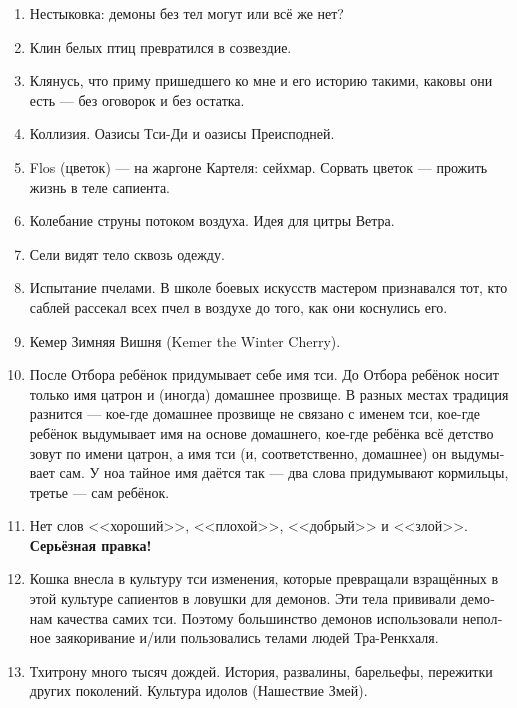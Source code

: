 \documentclass[a4paper,12pt,fleqn]{book}\usepackage{cooltooltips}\usepackage{polyglossia}\setdefaultlanguage[babelshorthands=true]{russian}\setotherlanguage{english}\defaultfontfeatures{Ligatures=TeX,Mapping=tex-text} \usepackage{xcolor}\definecolor{lightgray}{HTML}{bbbbbb}\color{lightgray}\newcommand{\ml}[3]{\textenglish{\textcolor{black}{#3}}}
\begin{document}
{\begin{enumerate}
\item Нестыковка: демоны без тел могут или всё же нет?

\item Клин белых птиц превратился в созвездие.

\item Клянусь, что приму пришедшего ко мне и его историю такими, каковы они есть --- без оговорок и без остатка.

\item Коллизия. Оазисы Тси-Ди и оазисы Преисподней.

\item Flos (цветок) --- на жаргоне Картеля: сейхмар.
Сорвать цветок --- прожить жизнь в теле сапиента.

\item Колебание струны потоком воздуха.
Идея для цитры Ветра.

\item Сели видят тело сквозь одежду.

\item Испытание пчелами.
В школе боевых искусств мастером признавался тот, кто саблей рассекал всех пчел в воздухе до того, как они коснулись его.

\item Кемер Зимняя Вишня (Kemer the Winter Cherry).

\item После Отбора ребёнок придумывает себе имя тси.
До Отбора ребёнок носит только имя цатрон и (иногда) домашнее прозвище.
В разных местах традиция разнится --- кое-где домашнее прозвище не связано с именем тси, кое-где ребёнок выдумывает имя на основе домашнего, кое-где ребёнка всё детство зовут по имени цатрон, а имя тси (и, соответственно, домашнее) он выдумывает сам.
У ноа тайное имя даётся так --- два слова придумывают кормильцы, третье --- сам ребёнок.

\item Нет слов <<хороший>>, <<плохой>>, <<добрый>> и <<злой>>.
\textbf{Серьёзная правка!}

\item Кошка внесла в культуру тси изменения, которые превращали взращённых в этой культуре сапиентов в ловушки для демонов.
Эти тела прививали демонам качества самих тси.
Поэтому большинство демонов использовали неполное заякоривание и/или пользовались телами людей Тра-Ренкхаля.

\item Тхитрону много тысяч дождей.
История, развалины, барельефы, пережитки других поколений.
Культура идолов (Нашествие Змей).


\end{enumerate}}
\end{document}
